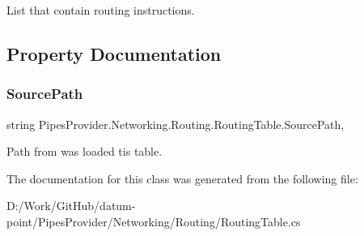 List that contain routing instructions. 



\subsection{Property Documentation}
\mbox{\label{class_pipes_provider_1_1_networking_1_1_routing_1_1_routing_table_af756c825762d5434f5b934a1c1b2d3eb}} 
\subsubsection{\texorpdfstring{Source\+Path}{SourcePath}}
{\footnotesize\ttfamily string Pipes\+Provider.\+Networking.\+Routing.\+Routing\+Table.\+Source\+Path\hspace{0.3cm}{\ttfamily [get]}, {\ttfamily [set]}}



Path from was loaded tis table. 



The documentation for this class was generated from the following file\+:\begin{DoxyCompactItemize}
\item 
D\+:/\+Work/\+Git\+Hub/datum-\/point/\+Pipes\+Provider/\+Networking/\+Routing/Routing\+Table.\+cs\end{DoxyCompactItemize}
